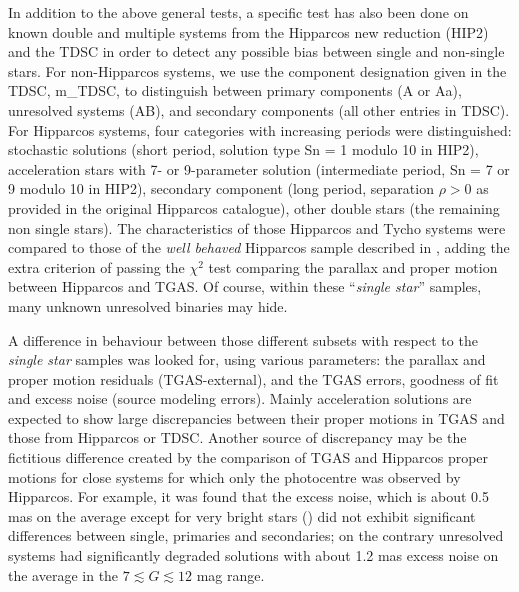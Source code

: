 In addition to the above general tests, a specific test has also been done on known double and multiple systems from the Hipparcos new reduction (HIP2) and the TDSC in order to detect any possible bias between single and non-single stars. For non-Hipparcos systems, we use the component designation given in the TDSC, m\_TDSC, to distinguish between primary components (A or Aa), unresolved systems (AB), and secondary components (all other entries in TDSC). For Hipparcos systems, four categories with increasing periods were distinguished: stochastic solutions (short period, solution type Sn = 1 modulo 10 in HIP2), acceleration stars with 7- or 9-parameter solution (intermediate period, Sn = 7 or 9 modulo 10 in HIP2), secondary component (long period, separation $\rho>0$ as provided in the original Hipparcos catalogue), other double stars (the remaining non single stars). 
The characteristics of those Hipparcos and Tycho systems were compared to those of the {\it well behaved} Hipparcos sample described in , adding the extra criterion of passing the $\chi^2$ test comparing the parallax and proper motion between Hipparcos and TGAS. Of course, within these ``{\it single star}'' samples, many unknown unresolved binaries may hide.

A difference in behaviour between those different subsets with respect to the {\it single star} samples was looked for, using various parameters: the parallax and proper motion residuals (TGAS-external), and the TGAS errors, goodness of fit and excess noise (source modeling errors). Mainly acceleration solutions are expected to show large discrepancies between their proper motions in TGAS and those from Hipparcos or TDSC. 
Another source of discrepancy may be the fictitious difference created by the comparison of TGAS and Hipparcos proper motions for close systems for which only the photocentre was observed by Hipparcos. 
For example, it was found that the excess noise, which is about 0.5 mas on the average except for very bright stars
() did not exhibit significant differences between
single, primaries and secondaries; on the contrary unresolved systems had significantly 
degraded solutions with about 1.2 mas excess noise on the average in the $7\lesssim G\lesssim 12$ mag range. 

